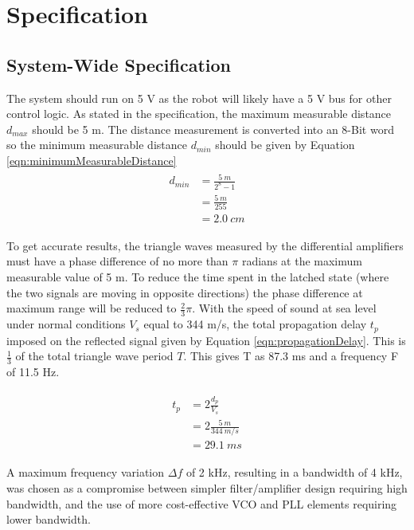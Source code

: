 \section{Specification}
\label{sec:specification}

\subsection{System-Wide Specification}
The system should run on 5 V as the robot will likely have a 5 V bus for other control logic.
As stated in the specification, the maximum measurable distance $d_{max}$ should be 5 m. 
The distance measurement is converted into an 8-Bit word so the minimum measurable distance $d_{min}$ should be given by Equation \ref{eqn:minimumMeasurableDistance}
\
\begin{align}
    \begin{split}
        d_{min} & =  \frac{5\ m}{2^8-1}\\
                & =  \frac{5\ m}{255}\\
                & =   2.0\ cm
    \end{split}
    \label{eqn:minimumMeasurableDistance}
\end{align}

To get accurate results, the triangle waves measured by the differential amplifiers must have a phase difference of no more than \(\pi\) radians at the maximum measurable value of 5 m.
To reduce the time spent in the latched state (where the two signals are moving in opposite directions) the phase difference at maximum range will be reduced to \(\frac{2}{3}\pi\). 
With the speed of sound at sea level under normal conditions $V_{s}$ equal to 344 m/s, the total propagation delay $t_{p}$ imposed on the reflected signal given by Equation \ref{eqn:propagationDelay}.
This is \(\frac{1}{3}\) of the total triangle wave period $T$. 
This gives T as 87.3 ms and a frequency F of 11.5 Hz.

\begin{align}
    \begin{split}
        t_{p} & = 2\frac{d_{p}}{V_{s}}\\
              & = 2\frac{5\ m}{344\ m/s}\\
              & = 29.1\ ms
    \end{split}
    \label{eqn:propagationDelay}
\end{align}

A maximum frequency variation $\Delta f$ of 2 kHz, resulting in a bandwidth of 4 kHz, was chosen as a compromise between simpler filter/amplifier design requiring high bandwidth, and the use of more cost-effective VCO and PLL elements requiring lower bandwidth.  
